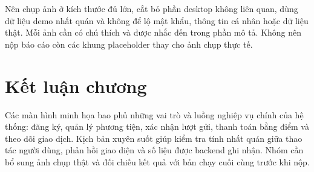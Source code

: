 Nên chụp ảnh ở kích thước đủ lớn, cắt bỏ phần desktop không liên quan, dùng dữ liệu demo nhất quán và không để lộ mật khẩu, thông tin cá nhân hoặc dữ liệu thật. Mỗi ảnh cần có chú thích và được nhắc đến trong phần mô tả. Không nên nộp báo cáo còn các khung placeholder thay cho ảnh chụp thực tế.

\section{Kết luận chương}

Các màn hình minh họa bao phủ những vai trò và luồng nghiệp vụ chính của hệ thống: đăng ký, quản lý phương tiện, xác nhận lượt gửi, thanh toán bằng điểm và theo dõi giao dịch. Kịch bản xuyên suốt giúp kiểm tra tính nhất quán giữa thao tác người dùng, phản hồi giao diện và số liệu được backend ghi nhận. Nhóm cần bổ sung ảnh chụp thật và đối chiếu kết quả với bản chạy cuối cùng trước khi nộp.
